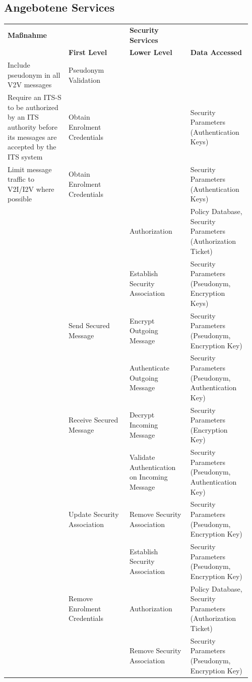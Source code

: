 \subsection{Angebotene Services}
 \begin{longtable}{| p{0.24\linewidth} | p{0.24\linewidth} | p{0.24\linewidth} |p{0.24\linewidth}|}
 \hline
 \textbf{Maßnahme} & & \textbf{Security Services} &  \\
 \cline{2-4}
 &\textbf{ First Level} & \textbf{Lower Level} & \textbf{Data Accessed}\\
 \hline
Include pseudonym in all V2V messages & Pseudonym Validation & & \\
 \hline
 Require an ITS-S to be authorized by an ITS authority before its messages are accepted by the ITS system & Obtain Enrolment Credentials & & Security Parameters (Authentication Keys)\\
 \hline
 Limit message traffic to V2I/I2V where possible & Obtain Enrolment Credentials & & Security Parameters (Authentication Keys) \\ 
 \cline{3-4}
 & & Authorization & Policy Database, Security Parameters (Authorization Ticket) \\
 \cline{3-4}
& & Establish Security Association & Security Parameters (Pseudonym, Encryption Keys) \\
 \cline{2-4}
 & Send Secured Message & Encrypt Outgoing Message & Security Parameters (Pseudonym, Encryption Key) \\
  \cline{3-4}
 &  & Authenticate Outgoing Message & Security Parameters (Pseudonym, Authentication Key) \\
 \cline{2-4}
 & Receive Secured Message & Decrypt Incoming Message & Security Parameters (Encryption Key) \\
  \cline{3-4}
 & & Validate Authentication on Incoming Message & Security Parameters (Pseudonym, Authentication Key) \\
 \cline{2-4}
 & Update Security Association & Remove Security Association & Security Parameters (Pseudonym, Encryption Key) \\
 \cline{3-4}
 & & Establish Security Association & Security Parameters (Pseudonym, Encryption Key) \\
 \cline{2-4}
 & Remove Enrolment Credentials & Authorization & Policy Database, Security Parameters (Authorization Ticket) \\
 \cline{3-4}
 & & Remove Security Association & Security Parameters (Pseudonym, Encryption Key) \\
 \hline

\end{longtable}
